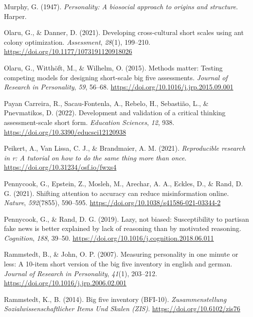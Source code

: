\documentclass[
  12pt,
  a4paper,
  twoside]{article}
\newlength{\cslhangindent}
\newenvironment{CSLReferences}[2] %
 {\begin{list}{}{%
  \setlength{\itemindent}{0pt}
  \setlength{\leftmargin}{0pt}
  \setlength{\parsep}{0pt}
  \ifodd #1
   \setlength{\leftmargin}{\cslhangindent}
   \setlength{\itemindent}{-1\cslhangindent}
  \fi
  \setlength{\itemsep}{#2\baselineskip}}}
 {\end{list}}
\begin{document}
\begin{CSLReferences}{1}{0}
Murphy, G. (1947). \emph{Personality: A biosocial approach to origins and structure}. Harper.

Olaru, G., \& Danner, D. (2021). Developing cross-cultural short scales using ant colony optimization. \emph{Assessment}, \emph{28}(1), 199--210. \url{https://doi.org/10.1177/1073191120918026}

Olaru, G., Witthöft, M., \& Wilhelm, O. (2015). Methods matter: Testing competing models for designing short-scale big five assessments. \emph{Journal of Research in Personality}, \emph{59}, 56--68. \url{https://doi.org/10.1016/j.jrp.2015.09.001}

Payan Carreira, R., Sacau-Fontenla, A., Rebelo, H., Sebastião, L., \& Pnevmatikos, D. (2022). Development and validation of a critical thinking assessment-scale short form. \emph{Education Sciences}, \emph{12}, 938. \url{https://doi.org/10.3390/educsci12120938}

Peikert, A., Van Lissa, C. J., \& Brandmaier, A. M. (2021). \emph{Reproducible research in r: A tutorial on how to do the same thing more than once}. \url{https://doi.org/10.31234/osf.io/fwxs4}

Pennycook, G., Epstein, Z., Mosleh, M., Arechar, A. A., Eckles, D., \& Rand, D. G. (2021). Shifting attention to accuracy can reduce misinformation online. \emph{Nature}, \emph{592}(7855), 590--595. \url{https://doi.org/10.1038/s41586-021-03344-2}

Pennycook, G., \& Rand, D. G. (2019). Lazy, not biased: Susceptibility to partisan fake news is better explained by lack of reasoning than by motivated reasoning. \emph{Cognition}, \emph{188}, 39--50. \url{https://doi.org/10.1016/j.cognition.2018.06.011}

Rammstedt, B., \& John, O. P. (2007). Measuring personality in one minute or less: A 10-item short version of the big five inventory in english and german. \emph{Journal of Research in Personality}, \emph{41}(1), 203--212. \url{https://doi.org/10.1016/j.jrp.2006.02.001}

Rammstedt, K., B. (2014). Big five inventory (BFI-10). \emph{Zusammenstellung Sozialwissenschaftlicher Items Und Skalen (ZIS)}. \url{https://doi.org/10.6102/zis76}


\end{CSLReferences}
\end{document}

